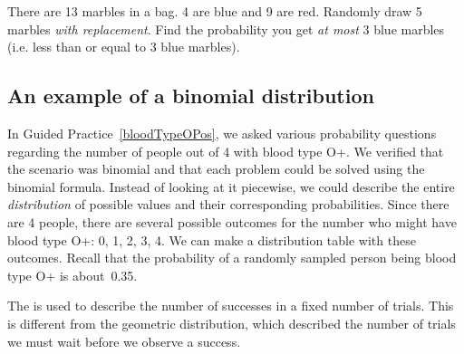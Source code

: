 \begin{exercisewrap}
\begin{nexercise}There are 13 marbles in a bag. 4 are blue and 9 are red. Randomly draw 5 marbles \emph{with replacement}. Find the probability you get \emph{at most} 3 blue marbles (i.e. less than or equal to 3 blue marbles).\footnotemark
\end{nexercise}
\end{exercisewrap}



\subsection{An example of a binomial distribution}

\newcommand{\oposprob}[0]{0.35}
\newcommand{\oposprobcomp}[0]{0.65}

In Guided Practice~\ref{bloodTypeOPos}, we asked various probability questions regarding the number of people out of 4 with blood type O+.  We verified that the scenario was binomial and that each problem could be solved using the binomial formula. Instead of looking at it piecewise, we could describe the entire \emph{distribution} of possible values and their corresponding probabilities. Since there are 4 people, there are several possible outcomes for the number who might have blood type O+: 0, 1, 2, 3, 4.
We can make a distribution table with these outcomes.
Recall that the probability of a randomly sampled person being blood type O+ is about~\oposprob{}.

The 
is used to describe
the number of successes in a fixed number of trials.
This is different from the geometric distribution,
which described the number of trials we must wait before
we observe a success.

